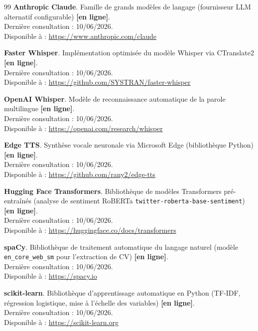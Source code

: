 \begin{thebibliography}{99}
\textbf{Anthropic Claude}. Famille de grands modèles de langage (fournisseur LLM alternatif configurable) \textbf{[en ligne]}.\\
Dernière consultation : 10/06/2026.\\
Disponible à : \url{https://www.anthropic.com/claude}

\textbf{Faster Whisper}. Implémentation optimisée du modèle Whisper via CTranslate2 \textbf{[en ligne]}.\\
Dernière consultation : 10/06/2026.\\
Disponible à : \url{https://github.com/SYSTRAN/faster-whisper}

\textbf{OpenAI Whisper}. Modèle de reconnaissance automatique de la parole multilingue \textbf{[en ligne]}.\\
Dernière consultation : 10/06/2026.\\
Disponible à : \url{https://openai.com/research/whisper}

\textbf{Edge TTS}. Synthèse vocale neuronale via Microsoft Edge (bibliothèque Python) \textbf{[en ligne]}.\\
Dernière consultation : 10/06/2026.\\
Disponible à : \url{https://github.com/rany2/edge-tts}

\textbf{Hugging Face Transformers}. Bibliothèque de modèles Transformers pré-entraînés (analyse de sentiment RoBERTa \texttt{twitter-roberta-base-sentiment}) \textbf{[en ligne]}.\\
Dernière consultation : 10/06/2026.\\
Disponible à : \url{https://huggingface.co/docs/transformers}

\textbf{spaCy}. Bibliothèque de traitement automatique du langage naturel (modèle \texttt{en\_core\_web\_sm} pour l'extraction de CV) \textbf{[en ligne]}.\\
Dernière consultation : 10/06/2026.\\
Disponible à : \url{https://spacy.io}

\textbf{scikit-learn}. Bibliothèque d'apprentissage automatique en Python (TF-IDF, régression logistique, mise à l'échelle des variables) \textbf{[en ligne]}.\\
Dernière consultation : 10/06/2026.\\
Disponible à : \url{https://scikit-learn.org}


\end{thebibliography}
